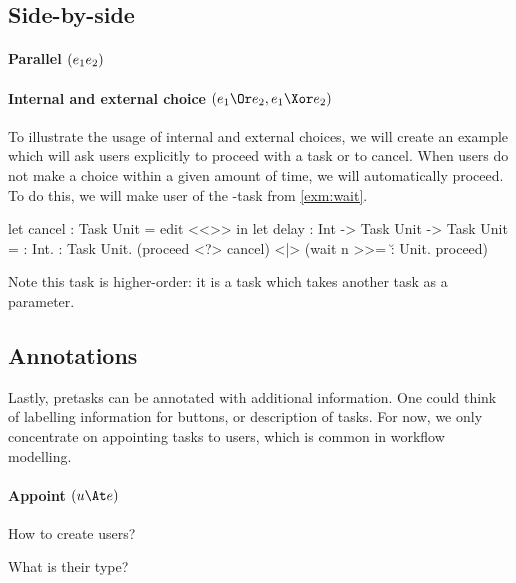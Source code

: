 \subsection{Side-by-side}



\paragraph{Parallel $(e_1 \relax e_2)$}




\paragraph{Internal and external choice $(e_1 \Or e_2, e_1 \Xor e_2)$}


\begin{example}[Delay]


To illustrate the usage of internal and external choices,
we will create an example which will ask users explicitly to proceed with a task or to cancel.
When users do not make a choice within a given amount of time,
we will automatically proceed.
To do this,
we will make user of the -task from \autoref{exm:wait}.
\begin{TASK}
  let cancel : Task Unit = edit <<>> in
  let delay : Int -> Task Unit -> Task Unit =
    \n : Int. \proceed : Task Unit.
    (proceed <?> cancel) <|> (wait n >>= \u : Unit. proceed)
\end{TASK}
Note this task is higher-order:
it is a task which takes another task as a parameter.

\end{example}



\subsection{Annotations}

Lastly, pretasks can be annotated with additional information.
One could think of labelling information for buttons,
or description of tasks.
For now, we only concentrate on appointing tasks to users,
which is common in workflow modelling.



\paragraph{Appoint $(u \At e)$}

\begin{itemize*}
  \item How to create users?
  \item What is their type?
\end{itemize*}
